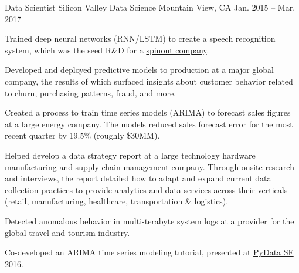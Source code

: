 \begin{cventries}

  \cventry
    {Data Scientist} %
    {Silicon Valley Data Science} %
    {Mountain View, CA} %
    {Jan. 2015 -- Mar. 2017} %
    {
      \begin{cvitems} %
        \item {Trained deep neural networks (RNN/LSTM) to create a speech recognition system, which was the seed R\&D for a {\href{https://www.lexicon.ai}{spinout company}}.} %
        \item {Developed and deployed predictive models to production at a major global company, the results of which surfaced insights about customer behavior related to churn, purchasing patterns, fraud, and more.} %
        \item {Created a process to train time series models (ARIMA) to forecast sales figures at a large energy company. The models reduced sales forecast error for the most recent quarter by 19.5\% (roughly \$30MM).} %
        \item {Helped develop a data strategy report at a large technology hardware manufacturing and supply chain management company. Through onsite research and interviews, the report detailed how to adapt and expand current data collection practices to provide analytics and data services across their verticals (retail, manufacturing, healthcare, transportation \& logistics).} %
        \item {Detected anomalous behavior in multi-terabyte system logs at a provider for the global travel and tourism industry.} %
        \item {Co-developed an ARIMA time series modeling tutorial, presented at {\href{https://pydata.org/sfo2016/schedule/presentation/38/}{PyData SF 2016}}.}
      \end{cvitems}
    }


\end{cventries}
